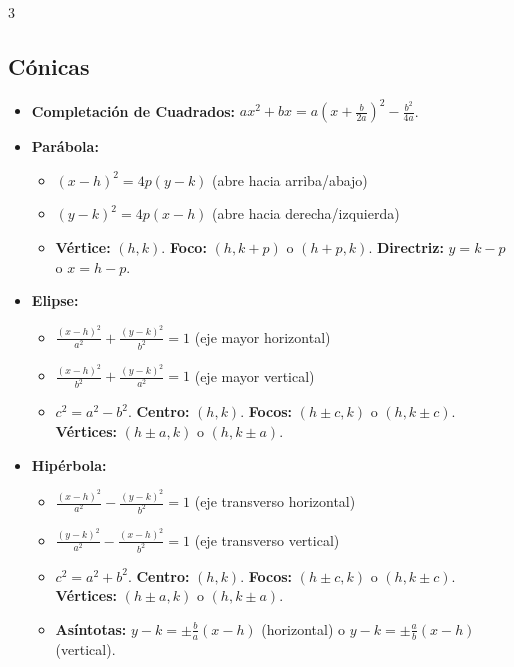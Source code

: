\documentclass[8pt,letterpaper]{article}
\begin{document}
\begin{multicols*}{3}
\subsection*{Cónicas}
\begin{itemize}
    \item \textbf{Completación de Cuadrados:}
    $ax^2+bx = a\left(x+\frac{b}{2a}\right)^2 - \frac{b^2}{4a}$.
    \item \textbf{Parábola:}
    \begin{itemize}
        \item $(x-h)^2 = 4p(y-k)$ (abre hacia arriba/abajo)
        \item $(y-k)^2 = 4p(x-h)$ (abre hacia derecha/izquierda)
        \item \textbf{Vértice:} $(h,k)$. \textbf{Foco:} $(h, k+p)$ o $(h+p, k)$. \textbf{Directriz:} $y=k-p$ o $x=h-p$.
    \end{itemize}
    \item \textbf{Elipse:}
    \begin{itemize}
        \item $\frac{(x-h)^2}{a^2} + \frac{(y-k)^2}{b^2} = 1$ (eje mayor horizontal)
        \item $\frac{(x-h)^2}{b^2} + \frac{(y-k)^2}{a^2} = 1$ (eje mayor vertical)
        \item $c^2 = a^2 - b^2$. \textbf{Centro:} $(h,k)$. \textbf{Focos:} $(h \pm c, k)$ o $(h, k \pm c)$. \textbf{Vértices:} $(h \pm a, k)$ o $(h, k \pm a)$.
    \end{itemize}
    \item \textbf{Hipérbola:}
    \begin{itemize}
        \item $\frac{(x-h)^2}{a^2} - \frac{(y-k)^2}{b^2} = 1$ (eje transverso horizontal)
        \item $\frac{(y-k)^2}{a^2} - \frac{(x-h)^2}{b^2} = 1$ (eje transverso vertical)
        \item $c^2 = a^2 + b^2$. \textbf{Centro:} $(h,k)$. \textbf{Focos:} $(h \pm c, k)$ o $(h, k \pm c)$. \textbf{Vértices:} $(h \pm a, k)$ o $(h, k \pm a)$.
        \item \textbf{Asíntotas:} $y-k = \pm \frac{b}{a}(x-h)$ (horizontal) o $y-k = \pm \frac{a}{b}(x-h)$ (vertical).
    \end{itemize}
\end{itemize}

\end{multicols*}
\newpage
\end{document}
